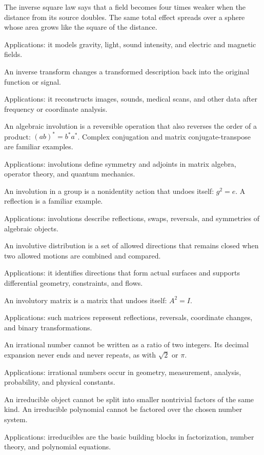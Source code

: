 The inverse square law says that a field becomes four times weaker when the distance from its source doubles. The same total effect spreads over a sphere whose area grows like the square of the distance. \par\noindent Applications: it models gravity, light, sound intensity, and electric and magnetic fields.

An inverse transform changes a transformed description back into the original function or signal. \par\noindent Applications: it reconstructs images, sounds, medical scans, and other data after frequency or coordinate analysis.

An algebraic involution is a reversible operation that also reverses the order of a product: $(ab)^*=b^*a^*$. Complex conjugation and matrix conjugate-transpose are familiar examples. \par\noindent Applications: involutions define symmetry and adjoints in matrix algebra, operator theory, and quantum mechanics.

An involution in a group is a nonidentity action that undoes itself: $g^2=e$. A reflection is a familiar example. \par\noindent Applications: involutions describe reflections, swaps, reversals, and symmetries of algebraic objects.

An involutive distribution is a set of allowed directions that remains closed when two allowed motions are combined and compared. \par\noindent Applications: it identifies directions that form actual surfaces and supports differential geometry, constraints, and flows.

An involutory matrix is a matrix that undoes itself: $A^2=I$. \par\noindent Applications: such matrices represent reflections, reversals, coordinate changes, and binary transformations.

An irrational number cannot be written as a ratio of two integers. Its decimal expansion never ends and never repeats, as with $\sqrt2$ or $\pi$. \par\noindent Applications: irrational numbers occur in geometry, measurement, analysis, probability, and physical constants.

An irreducible object cannot be split into smaller nontrivial factors of the same kind. An irreducible polynomial cannot be factored over the chosen number system. \par\noindent Applications: irreducibles are the basic building blocks in factorization, number theory, and polynomial equations.

